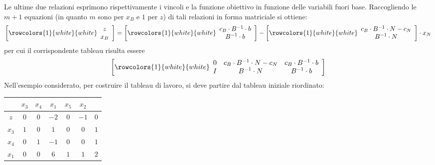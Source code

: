 \documentclass[a4paper]{extarticle}
\renewcommand\arraystretch{}
\begin{document}
\vspace{1em}
\noindent
Le ultime due relazioni esprimono rispettivamente i vincoli e la funzione obiettivo in funzione delle variabili fuori base.
Raccogliendo le $m + 1$ equazioni (in quanto $m$ sono per $x_B$ e $1$ per $z$) di tali relazioni in forma matriciale si ottiene:
\[
    \left[
    \rowcolors{1}{white}{white}
    \begin{array}{c}
        z\\
        x_B
    \end{array}
    \right]
    =
    \left[
    \rowcolors{1}{white}{white}
    \begin{array}{c}
        c_B \cdot B^{-1} \cdot b\\
        B^{-1} \cdot b
    \end{array}
    \right]
    -
    \left[
    \rowcolors{1}{white}{white}
    \begin{array}{c}
        c_B \cdot B^{-1} \cdot N - c_N\\
        B^{-1} \cdot N
    \end{array}
    \right]
    \cdot x_N
\]
per cui il corrispondente tableau risulta essere
\[
    \left[
    \rowcolors{1}{white}{white}
    \begin{array}{ccc}
        0 & c_B \cdot B^{-1} \cdot N - c_N & c_B \cdot B^{-1} \cdot b\\
        I & B^{-1} \cdot N & B^{-1} \cdot b
    \end{array}
    \right]
\]
Nell'esempio considerato, per costruire il tableau di lavoro, si deve partire dal tableau iniziale riordinato:

\vspace{1em}
\noindent
\begin{table}[H]
    \setlength{\tabcolsep}{4pt}
    \renewcommand{\arraystretch}{1.2}
    \noindent
    \centering
    \begin{tabular}{|c|ccc|cc|c|}
        & $x_3$ & $x_4$ & $x_1$ & $x_5$ & $x_2$ &\\
        \hline
        $z$ & $0$ & $0$ & $-2$ & $0$ & $-1$ & $0$\\
        \hline
        $x_3$ & \cellcolor{red!50!white}$1$ & \cellcolor{red!50!white}$0$ & \cellcolor{red!50!white}$1$ & \cellcolor{blue!50!white}$0$ & \cellcolor{blue!50!white}$0$ & \cellcolor{orange!25!white}$1$\\
        $x_4$ & \cellcolor{red!50!white}$0$ & \cellcolor{red!50!white}$1$ & \cellcolor{red!50!white}$-1$ & \cellcolor{blue!50!white}$0$ & \cellcolor{blue!50!white}$0$ & \cellcolor{orange!25!white}$1$\\
        $x_1$ & \cellcolor{red!50!white}$0$ & \cellcolor{red!50!white}$0$ & \cellcolor{red!50!white}$6$ & \cellcolor{blue!50!white}$1$ & \cellcolor{blue!50!white}$1$ & \cellcolor{orange!25!white}$2$\\
        \hline
    \end{tabular}
\end{table}
\end{document}
